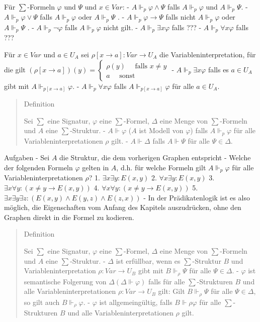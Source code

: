 \documentclass[a4paper]{article}
\begin{document}
\begin{multicols}{3}
  Für $\sum$-Formeln $\varphi$ und $\Psi$ und $x\in Var$: -
  $A\Vdash_p \varphi\wedge\Psi$ falls $A\Vdash_p\varphi$ und
  $A\Vdash_p \Psi$. - $A\Vdash_p \varphi\vee\Psi$ falls $A\Vdash_p\varphi$
  oder $A\Vdash_p\Psi$ . - $A\Vdash_p \varphi\rightarrow\Psi$ falls nicht
  $A\Vdash_p\varphi$ oder $A\Vdash_p\Psi$ . - $A\Vdash_p \lnot\varphi$
  falls $A\Vdash_p \varphi$ nicht gilt. - $A\Vdash_p \exists x\varphi$
  falls ??? - $A\Vdash_p \forall x\varphi$ falls ???

  Für $x\in Var$ und $a\in U_A$ sei
  $\rho[x\rightarrow a]:Var\rightarrow U_A$ die Variableninterpretation,
  für die gilt
  $(\rho[x\rightarrow a])(y) = \begin{cases} \rho(y) \quad\text{ falls } x\not=y \\ a \quad\text{ sonst } \end{cases}$
  - $A\Vdash_p \exists x\varphi$ falls es $a\in U_A$ gibt mit
  $A\Vdash_{p[x\rightarrow a]}\varphi$. - $A\Vdash_p \forall x\varphi$
  falls $A\Vdash_{p[x\rightarrow a]}\varphi$ für alle $a\in U_A$.

  \begin{quote}
    Definition

    Sei $\sum$ eine Signatur, $\varphi$ eine $\sum$-Formel, $\Delta$ eine
    Menge von $\sum$-Formeln und $A$ eine $\sum$-Struktur. -
    $A\Vdash\varphi$ ($A$ ist Modell von $\varphi$) falls $A\Vdash_p\varphi$
    für alle Variableninterpretationen $\rho$ gilt. - $A\Vdash\Delta$ falls
    $A\Vdash\Psi$ für alle $\Psi\in\Delta$.
  \end{quote}

  Aufgaben - Sei $A$ die Struktur, die dem vorherigen Graphen entspricht -
  Welche der folgenden Formeln $\varphi$ gelten in $A$, d.h. für welche
  Formeln gilt $A\Vdash_p\varphi$ für alle Variableninterpretationen
  $\rho$? 1. $\exists x\exists y:E(x,y)$ 2. $\forall x\exists y:E(x,y)$ 3.
  $\exists x\forall y:(x\not=y\rightarrow E(x,y))$ 4.
  $\forall x\forall y:(x\not=y\rightarrow E(x,y))$ 5.
  $\exists x\exists y\exists z:(E(x,y)\wedge E(y,z)\wedge E(z,x))$ - In
  der Prädikatenlogik ist es also möglich, die Eigenschaften vom Anfang
  des Kapitels auszudrücken, ohne den Graphen direkt in die Formel zu
  kodieren.

  \begin{quote}
    Definition

    Sei $\sum$ eine Signatur, $\varphi$ eine $\sum$-Formel, $\Delta$ eine
    Menge von $\sum$-Formeln und $A$ eine $\sum$-Struktur. - $\Delta$ ist
    erfüllbar, wenn es $\sum$-Struktur $B$ und Variableninterpretation
    $\rho:Var\rightarrow U_B$ gibt mit $B\Vdash_\rho\Psi$ für alle
    $\Psi\in\Delta$. - $\varphi$ ist semantische Folgerung von
    $\Delta(\Delta\Vdash\varphi)$ falls für alle $\sum$-Strukturen $B$ und
    alle Variableninterpretationen $\rho:Var\rightarrow U_B$ gilt: Gilt
    $B\Vdash_\rho\Psi$ für alle $\Psi\in\Delta$, so gilt auch
    $B\Vdash_\rho \varphi$. - $\varphi$ ist allgemeingültig, falls
    $B\Vdash \rho\varphi$ für alle $\sum$-Strukturen $B$ und alle
    Variableninterpretationen $\rho$ gilt.
  \end{quote}


\end{multicols}
\end{document}
